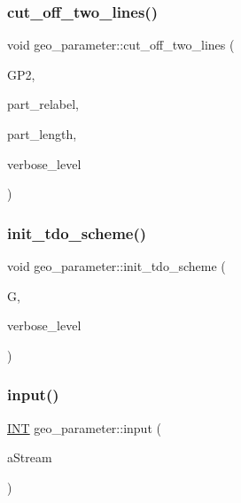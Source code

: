 \subsubsection{\texorpdfstring{cut\+\_\+off\+\_\+two\+\_\+lines()}{cut\_off\_two\_lines()}}
{\footnotesize\ttfamily void geo\+\_\+parameter\+::cut\+\_\+off\+\_\+two\+\_\+lines (\begin{DoxyParamCaption}\item[{\mbox{\hyperlink{classgeo__parameter}{geo\+\_\+parameter}} \&}]{G\+P2,  }\item[{\mbox{\hyperlink{galois_8h_a09fddde158a3a20bd2dcadb609de11dc}{I\+NT}} $\ast$\&}]{part\+\_\+relabel,  }\item[{\mbox{\hyperlink{galois_8h_a09fddde158a3a20bd2dcadb609de11dc}{I\+NT}} $\ast$\&}]{part\+\_\+length,  }\item[{\mbox{\hyperlink{galois_8h_a09fddde158a3a20bd2dcadb609de11dc}{I\+NT}}}]{verbose\+\_\+level }\end{DoxyParamCaption})}

\mbox{\label{classgeo__parameter_a054027061960485ce489da47ad285841}} 
\subsubsection{\texorpdfstring{init\+\_\+tdo\+\_\+scheme()}{init\_tdo\_scheme()}}
{\footnotesize\ttfamily void geo\+\_\+parameter\+::init\+\_\+tdo\+\_\+scheme (\begin{DoxyParamCaption}\item[{\mbox{\hyperlink{classtdo__scheme}{tdo\+\_\+scheme}} \&}]{G,  }\item[{\mbox{\hyperlink{galois_8h_a09fddde158a3a20bd2dcadb609de11dc}{I\+NT}}}]{verbose\+\_\+level }\end{DoxyParamCaption})}

\mbox{\label{classgeo__parameter_aedd476d7bf192bfe8ce7f311dde15bfe}} 
\subsubsection{\texorpdfstring{input()}{input()}}
{\footnotesize\ttfamily \mbox{\hyperlink{galois_8h_a09fddde158a3a20bd2dcadb609de11dc}{I\+NT}} geo\+\_\+parameter\+::input (\begin{DoxyParamCaption}\item[{ifstream \&}]{a\+Stream }\end{DoxyParamCaption})}

